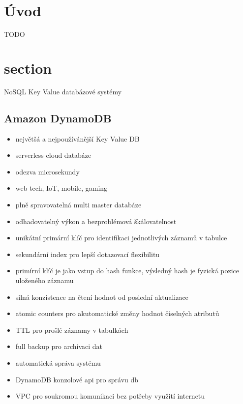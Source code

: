 \documentclass[czech,bachelor,dept460,male,csharp,cpdeclaration]{diploma}
\begin{document}
	
	\MakeTitlePages
	
	\chapter{Úvod}
	
	TODO
	
	\chapter{section}{NoSQL Key Value databázové systémy}
	\section{Amazon DynamoDB}
	\begin{itemize}
		\item největšá a nejpoužívánější Key Value DB
		\item serverless cloud databáze
		\item odezva microsekundy
		\item web tech, IoT, mobile, gaming
		\item plně spravovatelná multi master databáze
		\item odhadovatelný výkon a bezproblémová škálovatelnost
		\item unikátní primární klíč pro identifikaci jednotlivých záznamů v tabulce
		\item sekundární index pro lepší dotazovací flexibilitu
		\item primírní klíč je jako vstup do hash funkce, výsledný hash je fyzická pozice uloženého záznamu
		\item silná konzistence na čtení hodnot od poslední aktualizace
		\item atomic counters pro akutomatické změny hodnot číselných atributů
		\item TTL pro prošlé záznamy v tabulkách
		\item full backup pro archivaci dat
		\item automatická správa systému
		\item DynamoDB konzolové api pro správu db
		\item VPC pro soukromou komunikaci bez potřeby využití internetu
	\end{itemize}
		
\end{document}
